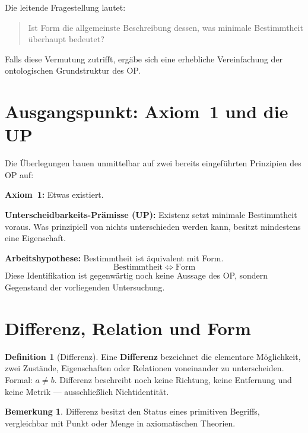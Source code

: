 \documentclass[11pt,a4paper]{article}
\theoremstyle{plain}
\theoremstyle{definition}
\newtheorem{definition}{Definition}[section]
\newtheorem{remark}{Bemerkung}[section]
\begin{document}
Die leitende Fragestellung lautet:

\begin{quote}
Ist Form die allgemeinste Beschreibung dessen, was minimale Bestimmtheit
\"{u}berhaupt bedeutet?
\end{quote}

Falls diese Vermutung zutrifft, erg\"{a}be sich eine erhebliche Vereinfachung der
ontologischen Grundstruktur des OP.

\section{Ausgangspunkt: Axiom~1 und die UP}

Die \"{U}berlegungen bauen unmittelbar auf zwei bereits eingef\"{u}hrten Prinzipien
des OP auf:

\textbf{Axiom~1:} Etwas existiert.

\textbf{Unterscheidbarkeits-Pr\"{a}misse (UP):} Existenz setzt minimale Bestimmtheit
voraus. Was prinzipiell von nichts unterschieden werden kann, besitzt mindestens
eine Eigenschaft.

\textbf{Arbeitshypothese:} Bestimmtheit ist \"{a}quivalent mit Form.
\[
  \boxed{\text{Bestimmtheit} \;\Longleftrightarrow\; \text{Form}}
\]
Diese Identifikation ist gegenw\"{a}rtig noch keine Aussage des OP, sondern Gegenstand
der vorliegenden Untersuchung.

\section{Differenz, Relation und Form}

\begin{definition}[Differenz]
Eine \textbf{Differenz} bezeichnet die elementare M\"{o}glichkeit, zwei Zust\"{a}nde,
Eigenschaften oder Relationen voneinander zu unterscheiden. Formal: $a \neq b$.
Differenz beschreibt noch keine Richtung, keine Entfernung und keine Metrik ---
ausschlie\ss{}lich Nichtidentit\"{a}t.
\end{definition}

\begin{remark}
Differenz besitzt den Status eines primitiven Begriffs, vergleichbar mit
\glqq{}Punkt\grqq{} oder \glqq{}Menge\grqq{} in axiomatischen Theorien.
\end{remark}
\end{document}
